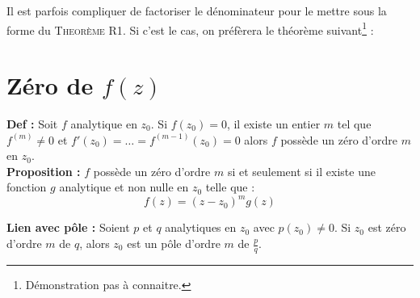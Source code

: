 	Il est parfois compliquer de factoriser le dénominateur pour le mettre sous la forme
	du \textsc{Theorème R1}. Si c'est le cas, on préfèrera le théorème suivant\footnote{
	Démonstration pas à connaitre.} :\\
	

\section{Zéro de $f(z)$}
\textbf{Def :} Soit $f$ analytique en $z_0$. Si $f(z_0) = 0$, il existe un entier $m$ tel que
$f^{(m)}\neq 0$ et $f'(z_0) = \dots = f^{(m-1)}(z_0) = 0$ alors $f$ possède un 
zéro d'ordre $m$ en $z_0$.\\

\textbf{Proposition :} $f$ possède un zéro d'ordre $m$ si et seulement si il existe une fonction $g$ analytique et non nulle en $z_0$ telle que :
\begin{equation}
f(z) = (z-z_0)^mg(z)
\end{equation}

\textbf{Lien avec pôle :} Soient $p$ et $q$ analytiques en $z_0$ avec $p(z_0)\neq 0$. Si
$z_0$ est zéro d'ordre $m$ de $q$, alors $z_0$ est un pôle d'ordre $m$ de $\frac{p}{q}$.

